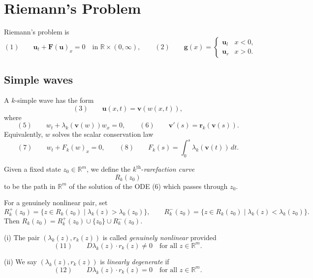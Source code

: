 \section{Riemann's Problem}\label{sec:riemanns-problem}

Riemann's problem is
\[
(1)\qquad \mathbf u_t+\mathbf F(\mathbf u)_x=0
\quad\text{in }\mathbb R\times(0,\infty),
\qquad
(2)\qquad
\mathbf g(x)=
\begin{cases}
\mathbf u_l & x<0,\\
\mathbf u_r & x>0.
\end{cases}
\]

\subsection{Simple waves}\label{sec:simple-waves}

A $k$-simple wave has the form
\[
(3)\qquad \mathbf u(x,t)=\mathbf v(w(x,t)),
\]
where
\[
(5)\qquad w_t+\lambda_k(\mathbf v(w))w_x=0,
\qquad
(6)\qquad \mathbf v'(s)=\mathbf r_k(\mathbf v(s)).
\]
Equivalently, $w$ solves the scalar conservation law
\[
(7)\qquad w_t+F_k(w)_x=0,
\qquad
(8)\qquad F_k(s)=\int_0^s\lambda_k(\mathbf v(t))\,dt.
\]

\begin{definition}
\label{def:rarefaction-curve}
Given a fixed state $z_0\in\mathbb{R}^m$, we define the $k^{\text{th}}$-\textit{rarefaction curve}
$$R_k(z_0)$$
to be the path in $\mathbb{R}^m$ of the solution of the ODE (6) which passes through $z_0$.
\end{definition}

For a genuinely nonlinear pair, set
\[
R_k^+(z_0)=\{z\in R_k(z_0)\mid\lambda_k(z)>\lambda_k(z_0)\},
\qquad
R_k^-(z_0)=\{z\in R_k(z_0)\mid\lambda_k(z)<\lambda_k(z_0)\}.
\]
Then $R_k(z_0)=R_k^+(z_0)\cup\{z_0\}\cup R_k^-(z_0)$.

\begin{definition}
\label{def:genuinely-nonlinear-linearly-degenerate}
(i) The pair $(\lambda_k(z), r_k(z))$ is called \textit{genuinely nonlinear} provided
$$(11) \qquad D\lambda_k(z)\cdot r_k(z) \neq 0 \quad \text{for all } z\in\mathbb{R}^m.$$

(ii) We say $(\lambda_k(z), r_k(z))$ is \textit{linearly degenerate} if
$$(12) \qquad D\lambda_k(z)\cdot r_k(z) = 0 \quad \text{for all } z\in\mathbb{R}^m.$$
\end{definition}

